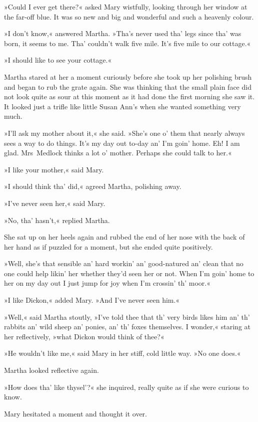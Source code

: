 »Could I ever get there?« asked Mary wistfully, looking through her window at the far-off blue. It was so new and big and wonderful and such a heavenly colour.

»I don't know,« answered Martha. »Tha's never used tha' legs since tha' was born, it seems to me. Tha' couldn't walk five mile. It's five mile to our cottage.«

»I should like to see your cottage.«

Martha stared at her a moment curiously before she took up her polishing brush and began to rub the grate again. She was thinking that the small plain face did not look quite as sour at this moment as it had done the first morning she saw it. It looked just a trifle like little Susan Ann's when she wanted something very much.

»I'll ask my mother about it,« she said. »She's one o' them that nearly always sees a way to do things. It's my day out to-day an' I'm goin' home. Eh! I am glad. Mrs~Medlock thinks a lot o' mother. Perhaps she could talk to her.«

»I like your mother,« said Mary.

»I should think tha' did,« agreed Martha, polishing away.

»I've never seen her,« said Mary.

»No, tha' hasn't,« replied Martha.

She sat up on her heels again and rubbed the end of her nose with the back of her hand as if puzzled for a moment, but she ended quite positively.

»Well, she's that sensible an' hard workin' an' good-natured an' clean that no one could help likin' her whether they'd seen her or not. When I'm goin' home to her on my day out I just jump for joy when I'm crossin' th' moor.«

»I like Dickon,« added Mary. »And I've never seen him.«

»Well,« said Martha stoutly, »I've told thee that th' very birds likes him an' th' rabbits an' wild sheep an' ponies, an' th' foxes themselves. I wonder,« staring at her reflectively, »what Dickon would think of thee?«

»He wouldn't like me,« said Mary in her stiff, cold little way. »No one does.«

Martha looked reflective again.

»How does tha' like thysel'?« she inquired, really quite as if she were curious to know.

Mary hesitated a moment and thought it over.

